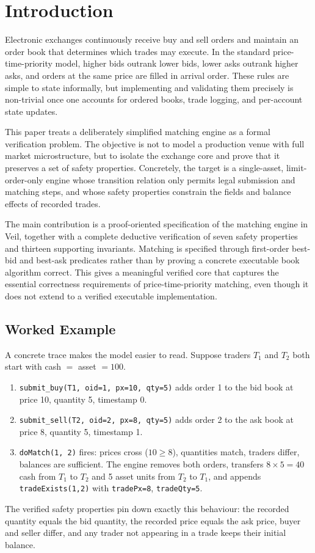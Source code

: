 \section{Introduction}

Electronic exchanges continuously receive buy and sell orders and maintain an
order book that determines which trades may execute. In the standard
price-time-priority model, higher bids outrank lower bids, lower asks outrank
higher asks, and orders at the same price are filled in arrival order. These
rules are simple to state informally, but implementing and validating them
precisely is non-trivial once one accounts for ordered books, trade logging,
and per-account state updates.

This paper treats a deliberately simplified matching engine as a formal
verification problem. The objective is not to model a production venue with
full market microstructure, but to isolate the exchange core and prove that it
preserves a set of safety properties. Concretely, the target is a
single-asset, limit-order-only engine whose transition relation only permits
legal submission and matching steps, and whose safety properties constrain the
fields and balance effects of recorded trades.

The main contribution is a proof-oriented specification of the matching engine
in Veil, together with a complete deductive verification of seven safety
properties and thirteen supporting invariants. Matching is specified through
first-order best-bid and best-ask predicates rather than by proving a concrete
executable book algorithm correct. This gives a meaningful verified core that
captures the essential correctness requirements of price-time-priority
matching, even though it does not extend to a verified executable
implementation.

\subsection*{Worked Example}

A concrete trace makes the model easier to read. Suppose traders \(T_1\) and
\(T_2\) both start with cash \(=\) asset \(= 100\).

\begin{enumerate}[leftmargin=2em,itemsep=2pt,topsep=2pt]
  \item \texttt{submit\_buy(T1, oid=1, px=10, qty=5)} adds order 1 to the bid
        book at price 10, quantity 5, timestamp 0.
  \item \texttt{submit\_sell(T2, oid=2, px=8, qty=5)} adds order 2 to the ask
        book at price 8, quantity 5, timestamp 1.
  \item \texttt{doMatch(1, 2)} fires: prices cross (\(10 \ge 8\)), quantities
        match, traders differ, balances are sufficient. The engine removes both
        orders, transfers \(8 \times 5 = 40\) cash from \(T_1\) to \(T_2\) and
        5 asset units from \(T_2\) to \(T_1\), and appends
        \texttt{tradeExists(1,2)} with \texttt{tradePx=8}, \texttt{tradeQty=5}.
\end{enumerate}

The verified safety properties pin down exactly this behaviour: the recorded
quantity equals the bid quantity, the recorded price equals the ask price,
buyer and seller differ, and any trader not appearing in a trade keeps their
initial balance.
